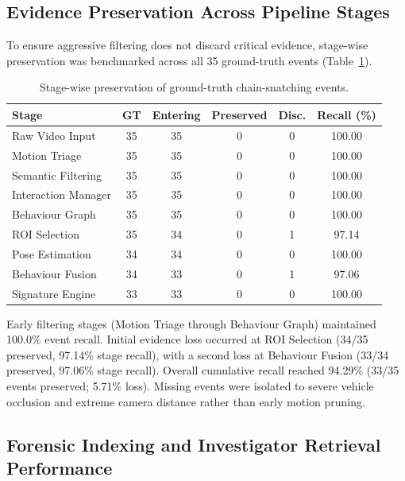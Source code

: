 \documentclass[runningheads]{llncs}
\begin{document}
\subsection{Evidence Preservation Across Pipeline Stages}

To ensure aggressive filtering does not discard critical evidence, stage-wise preservation was benchmarked across all 35 ground-truth events (Table~\ref{tab:event_preservation}).

\begin{table}[htbp]
\centering
\scriptsize
\setlength{\tabcolsep}{2.5pt}
\renewcommand{\arraystretch}{0.85}
\caption{Stage-wise preservation of ground-truth chain-snatching events.}
\label{tab:event_preservation}

\begin{tabular}{lccccc}
\hline
\textbf{Stage} &
\textbf{GT} &
\textbf{Entering} &
\textbf{Preserved} &
\textbf{Disc.} &
\textbf{Recall (\%)} \\
\hline
Raw Video Input       & 35 & 35 & 0  & 0 & 100.00 \\
Motion Triage         & 35 & 35 & 0  & 0 & 100.00 \\
Semantic Filtering    & 35 & 35 & 0  & 0 & 100.00 \\
Interaction Manager   & 35 & 35 & 0  & 0 & 100.00 \\
Behaviour Graph       & 35 & 35 & 0  & 0 & 100.00 \\
ROI Selection         & 35 & 34 & 0  & 1 & 97.14 \\
Pose Estimation       & 34 & 34 & 0  & 0 & 100.00 \\
Behaviour Fusion      & 34 & 33 & 0  & 1 & 97.06 \\
Signature Engine      & 33 & 33 & 0  & 0 & 100.00 \\
\hline
\end{tabular}
\end{table}

Early filtering stages (Motion Triage through Behaviour Graph) maintained 100.0\% event recall. Initial evidence loss occurred at ROI Selection (34/35 preserved, 97.14\% stage recall), with a second loss at Behaviour Fusion (33/34 preserved, 97.06\% stage recall). Overall cumulative recall reached 94.29\% (33/35 events preserved; 5.71\% loss). Missing events were isolated to severe vehicle occlusion and extreme camera distance rather than early motion pruning.

\subsection{Forensic Indexing and Investigator Retrieval Performance}
\end{document}

